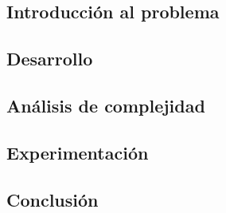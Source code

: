 

\subsection{Introducción al problema}




\subsection{Desarrollo}




\subsection{Análisis de complejidad}




\subsection{Experimentación}




\subsection{Conclusión}

